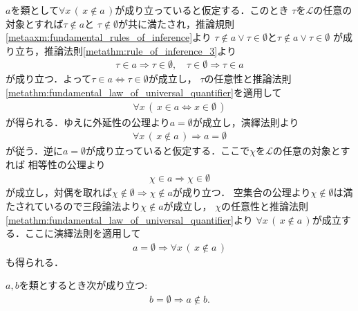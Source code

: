 	\begin{prf}
		$a$を類として$\forall x\, (\, x \notin a\, )$が成り立っていると仮定する．このとき
		$\tau$を$\mathcal{L}$の任意の対象とすれば$\tau \notin a$と
		$\tau \notin \emptyset$が共に満たされ，推論規則\ref{metaaxm:fundamental_rules_of_inference}より
		$\tau \notin a \vee \tau \in \emptyset$と$\tau \notin a \vee \tau \in \emptyset$
		が成り立ち，推論法則\ref{metathm:rule_of_inference_3}より
		\begin{align}
			\tau \in a \Longrightarrow \tau \in \emptyset, \quad
			\tau \in \emptyset \Longrightarrow \tau \in a
		\end{align}
		が成り立つ．よって$\tau \in a \Longleftrightarrow \tau \in \emptyset$が成立し，
		$\tau$の任意性と推論法則\ref{metathm:fundamental_law_of_universal_quantifier}を適用して
		\begin{align}
			\forall x\, (\, x \in a \Longleftrightarrow x \in \emptyset\, )
		\end{align}
		が得られる．ゆえに外延性の公理より$a = \emptyset$が成立し，演繹法則より
		\begin{align}
			\forall x\, (\, x \notin a\, ) \Longrightarrow a = \emptyset
		\end{align}
		が従う．逆に$a = \emptyset$が成り立っていると仮定する．ここで$\chi$を$\mathcal{L}$の任意の対象とすれば
		相等性の公理より
		\begin{align}
			\chi \in a \Longrightarrow \chi \in \emptyset
		\end{align}
		が成立し，対偶を取れば$\chi \notin \emptyset \Longrightarrow \chi \notin a$が成り立つ．
		空集合の公理より$\chi \notin \emptyset$は満たされているので三段論法より$\chi \notin a$が成立し，
		$\chi$の任意性と推論法則\ref{metathm:fundamental_law_of_universal_quantifier}より
		$\forall x\, (\, x \notin a\, )$が成立する．ここに演繹法則を適用して
		\begin{align}
			a = \emptyset \Longrightarrow \forall x\, (\, x \notin a\, )
		\end{align}
		も得られる．
		\QED
	\end{prf}
	
	\begin{screen}
		\begin{thm}[空集合はいかなる類も要素に持たない]
		\label{thm:emptyset_does_not_contain_any_class}
			$a,b$を類とするとき次が成り立つ:
			\begin{align}
				b = \emptyset \Longrightarrow a \notin b.
			\end{align}
		\end{thm}
	\end{screen}
	
